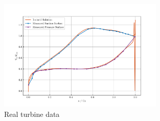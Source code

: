 \documentclass{article}
\begin{document}

\begin{figure}[H]
    \centering
    \includegraphics[width=0.7\textwidth]{figures/turbine_real.png}
    \caption{Real turbine data \cite{4A3_lab}}
    \label{fig:turbine_real}
\end{figure}
\end{document}
